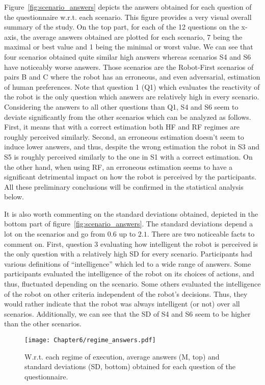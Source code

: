 Figure~\ref{fig:scenario_answers} depicts the answers obtained for each question of the questionnaire w.r.t. each scenario. This figure provides a very visual overall summary of the study. On the top part, for each of the 12 questions on the x-axis, the average answers obtained are plotted for each scenario, 7 being the maximal or best value and 1 being the minimal or worst value. 
We can see that four scenarios obtained quite similar high answers whereas scenarios S4 and S6 have noticeably worse answers. Those scenarios are the Robot-First scenarios of pairs B and C where the robot has an erroneous, and even adversarial, estimation of human preferences. 
Note that question 1 (Q1) which evaluates the reactivity of the robot is the only question which answers are relatively high in every scenario.
Considering the answers to all other questions than Q1, S4 and S6 seem to deviate significantly from the other scenarios which can be analyzed as follows.
First, it means that with a correct estimation both HF and RF regimes are roughly perceived similarly. 
Second, an erroneous estimation doesn't seem to induce lower answers, and thus, despite the wrong estimation the robot in S3 and S5 is roughly perceived similarly to the one in S1 with a correct estimation.
On the other hand, when using RF, an erroneous estimation seems to have a significant detrimental impact on how the robot is perceived by the participants.
All these preliminary conclusions will be confirmed in the statistical analysis below.

It is also worth commenting on the standard deviations obtained, depicted in the bottom part of figure~\ref{fig:scenario_answers}. The standard deviations depend a lot on the scenarios and go from $0.6$ up to $2.1$. There are two noticeable facts to comment on.
First, question 3 evaluating how intelligent the robot is perceived is the only question with a relatively high SD for every scenario. Participants had various definitions of ``intelligence'' which led to a wide range of answers. Some participants evaluated the intelligence of the robot on its choices of actions, and thus, fluctuated depending on the scenario. Some others evaluated the intelligence of the robot on other criteria independent of the robot's decisions. Thus, they would rather indicate that the robot was always intelligent (or not) over all scenarios.
Additionally, we can see that the SD of S4 and S6 seem to be higher than the other scenarios.

\begin{figure}[h]
    \center
    \texttt{[image: Chapter6/regime\_answers.pdf]}
    \caption{W.r.t. each regime of execution, average answers (M, top) and standard deviations (SD, bottom) obtained for each question of the questionnaire.}
    \label{fig:regime_answers}
\end{figure}

